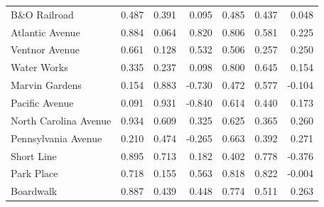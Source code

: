 \begin{table}[htbp]
{\begin{tabular}{lrrr|rrr}
    B\&O Railroad & 0.487  & 0.391  & 0.095  & 0.485  & 0.437  & 0.048 \\
    Atlantic Avenue & 0.884  & 0.064  & 0.820  & 0.806  & 0.581  & 0.225 \\
    Ventnor Avenue & 0.661  & 0.128  & 0.532  & 0.506  & 0.257  & 0.250 \\
    Water Works & 0.335  & 0.237  & 0.098  & 0.800  & 0.645  & 0.154 \\
    Marvin Gardens & 0.154  & 0.883  & -0.730 & 0.472  & 0.577  & -0.104 \\
    Pacific Avenue & 0.091  & 0.931  & -0.840 & 0.614  & 0.440  & 0.173 \\
    North Carolina Avenue & 0.934  & 0.609  & 0.325  & 0.625  & 0.365  & 0.260 \\
    Pennsylvania Avenue & 0.210  & 0.474  & -0.265 & 0.663  & 0.392  & 0.271 \\
    Short Line & 0.895  & 0.713  & 0.182  & 0.402  & 0.778  & -0.376 \\
    Park Place & 0.718  & 0.155  & 0.563  & 0.818  & 0.822  & -0.004 \\
    Boardwalk & 0.887  & 0.439  & 0.448  & 0.774  & 0.511  & 0.263 \\
    \bottomrule
    \end{tabular}}
  \label{apptab:chromo_compare}%
\end{table}%

